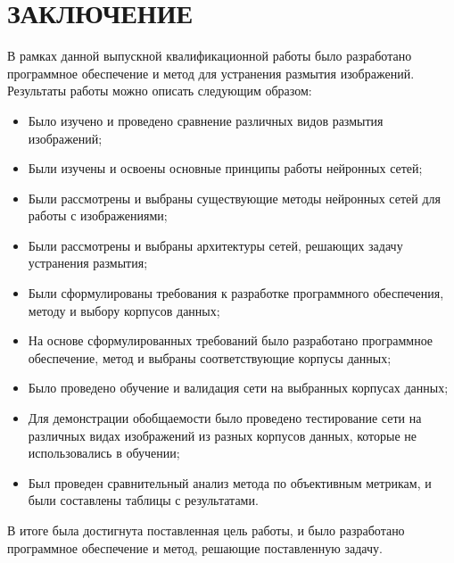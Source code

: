 \part*{ЗАКЛЮЧЕНИЕ}

В рамках данной выпускной квалификационной работы было разработано программное обеспечение и метод для устранения размытия изображений. Результаты работы можно описать следующим образом:

\begin{itemize}
    \item Было изучено и проведено сравнение различных видов размытия изображений;
    \item Были изучены и освоены основные принципы работы нейронных сетей;
    \item Были рассмотрены и выбраны существующие методы нейронных сетей для работы с изображениями;
    \item Были рассмотрены и выбраны архитектуры сетей, решающих задачу устранения размытия;
    \item Были сформулированы требования к разработке программного обеспечения, методу и выбору корпусов данных;
    \item На основе сформулированных требований было разработано программное обеспечение, метод и выбраны соответствующие корпусы данных;
    \item Было проведено обучение и валидация сети на выбранных корпусах данных;
    \item Для демонстрации обобщаемости было проведено тестирование сети на различных видах изображений из разных корпусов данных, которые не использовались в обучении;
    \item Был проведен сравнительный анализ метода по объективным метрикам, и были составлены таблицы с результатами.
\end{itemize}


В итоге была достигнута поставленная цель работы, и было разработано программное обеспечение и метод, решающие поставленную задачу.